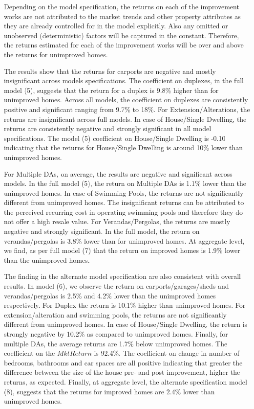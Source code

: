 \documentclass[AEJ,reqno, draftmode]{AEA} %
\begin{document}
Depending on the model specification, the returns on each of the improvement works are not attributed to the market trends and other property attributes as they are already controlled for in the model explicitly. Also any omitted or unobserved (deterministic) factors will be captured in the constant. Therefore, the returns estimated for each of the improvement works will be over and above the returns for unimproved homes. 


The results show that the returns for carports are negative and mostly insignificant across models specifications. The coefficient on duplexes, in the full model (5), suggests that the return for a duplex is 9.8\% higher than for unimproved homes. Across all models, the coefficient on duplexes are consistently positive and significant ranging from 9.7\% to 18\%. For Extension/Alterations, the returns are insignificant across full models. In case of House/Single Dwelling, the returns are consistently negative and strongly significant in all model specifications. The model (5) coefficient on House/Single Dwelling is -0.10 indicating that the returns for House/Single Dwelling is around 10\% lower than unimproved homes. 


\restoregeometry

For Multiple DAs, on average, the results are negative and significant across models. In the full model (5), the return on Multiple DAs is 1.1\% lower than the unimproved homes. In case of Swimming Pools, the returns are not significantly different from unimproved homes. The insignificant returns can be attributed to the perceived recurring cost in operating swimming pools and therefore they do not offer a high resale value. For Verandas/Pergolas, the returns are mostly negative and strongly significant. In the full model, the return on verandas/pergolas is 3.8\% lower than for unimproved homes. At aggregate level, we find, as per full model (7) that the return on improved homes is 1.9\% lower than the unimproved homes.

The finding in the alternate model specification are also consistent with overall results. In model (6), we observe the return on carports/garages/sheds and verandas/pergolas is 2.5\% and 4.2\% lower than the unimproved homes respectively. For Duplex the return is 10.1\% higher than unimproved homes. For extension/alteration and swimming pools, the returns are not significantly different from unimproved homes. In case of House/Single Dwelling, the return is strongly negative by 10.2\% as compared to unimproved homes. Finally, for multiple DAs, the average returns are 1.7\% below unimproved homes. The coefficient on the $MktReturn$ is 92.4\%. The coefficient on change in number of bedrooms, bathrooms and car spaces are all positive indicating that greater the difference between the size of the house pre- and post improvement, higher the returns, as expected. Finally, at aggregate level, the alternate specification model (8), suggests that the returns for improved homes are 2.4\% lower than unimproved homes.
\end{document}
